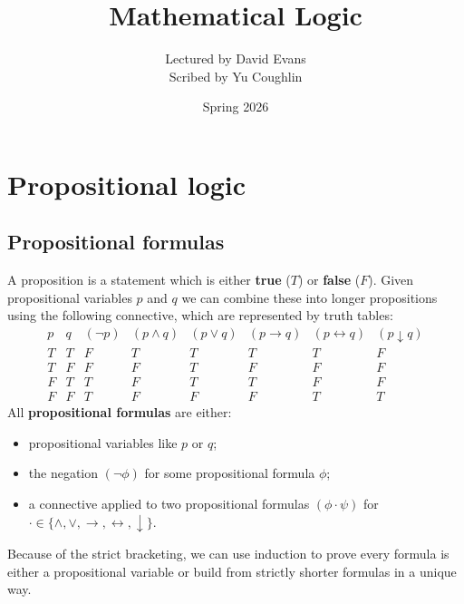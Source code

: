 \documentclass{article}
\begin{document}
\title{Mathematical Logic}
\author{Lectured by David Evans \\
Scribed by Yu Coughlin}
\date{Spring 2026}

\maketitle

\tableofcontents

\section{Propositional logic}

\subsection{Propositional formulas}

\begin{definition}
    A proposition is a statement which is either \textbf{true} ($T$) or \textbf{false} ($F$). Given propositional variables $p$ and $q$ we can combine these into longer propositions using the following connective, which are represented by truth tables:
    \[\begin{array}{cc|cccccc}
        p & q & (\neg p) & (p\wedge q) & (p\vee q) & (p \rightarrow q) & (p\leftrightarrow q) & (p\downarrow q)\\ \hline 
        T & T & F & T & T & T & T & F\\
        T & F & F & F & T & F & F & F\\
        F & T & T & F & T & T & F & F\\
        F & F & T & F & F & F & T & T
    \end{array}\]
    All \textbf{propositional formulas} are either:\begin{itemize}
        \item propositional variables like $p$ or $q$;
        \item the negation $(\neg\phi)$ for some propositional formula $\phi$;
        \item a connective applied to two propositional formulas $(\phi\cdot\psi)$ for $\cdot\in\{\wedge,\vee,\rightarrow,\leftrightarrow,\downarrow\}$.
    \end{itemize}
\end{definition}

Because of the strict bracketing, we can use induction to prove every formula is either a propositional variable or build from strictly shorter formulas in a unique way.
\end{document}

